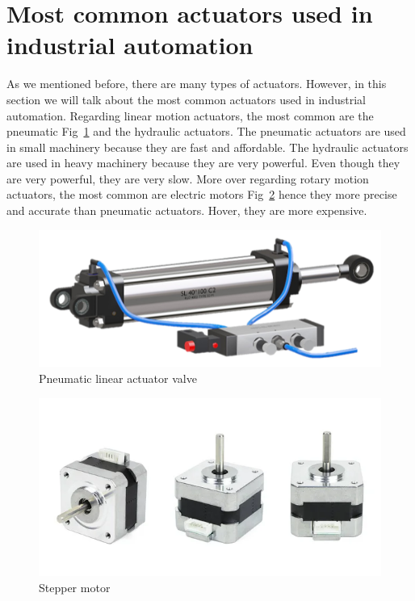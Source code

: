 \documentclass[runningheads]{llncs}
\begin{document}
\section{Most common actuators used in industrial automation}

As we mentioned before, there are many types of actuators. However, in this section we will talk about the most common actuators used in industrial automation.
Regarding linear motion actuators, the most common are the pneumatic Fig~\ref{fig:valve} and the hydraulic actuators. The pneumatic actuators are used in small machinery because
they are fast and affordable. The hydraulic actuators are used in heavy machinery because they are very powerful. Even though they are very powerful, they are very slow.
More over regarding rotary motion actuators, the most common are electric motors Fig~\ref{fig:stepMotor} hence they more precise and accurate than pneumatic actuators. Hover, they are more expensive.


\begin{figure}[!h]
    \centering
    \caption{Pneumatic linear actuator valve\cite{Valve}}\label{fig:valve}
    \includegraphics[scale = 0.6]{valve.png}
\end{figure}

\begin{figure}[!h]
    \centering
    \caption{Stepper motor\cite{Nema}}\label{fig:stepMotor}
    \includegraphics[scale = 0.55]{stepMotor.png}
\end{figure}
\end{document}

